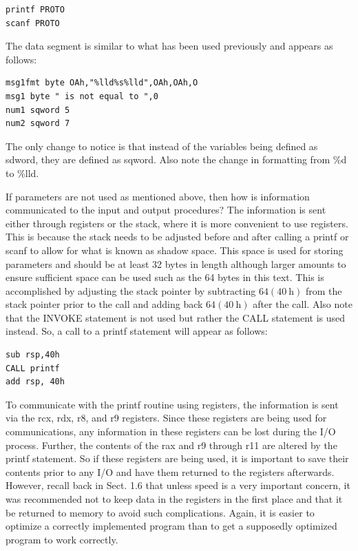 \documentclass[10pt]{book}
\begin{document}
\begin{verbatim}
printf PROTO
scanf PROTO
\end{verbatim}

The data segment is similar to what has been used previously and appears as follows:

\begin{verbatim}
msg1fmt byte OAh,"%lld%s%lld",OAh,OAh,O
msg1 byte " is not equal to ",0
num1 sqword 5
num2 sqword 7
\end{verbatim}

The only change to notice is that instead of the variables being defined as sdword, they are defined as sqword. Also note the change in formatting from \%d to \%lld.

If parameters are not used as mentioned above, then how is information communicated to the input and output procedures? The information is sent either through registers or the stack, where it is more convenient to use registers. This is because the stack needs to be adjusted before and after calling a printf or scanf to allow for what is known as shadow space. This space is used for storing parameters and should be at least 32 bytes in length although larger amounts to ensure sufficient space can be used such as the 64 bytes in this text. This is accomplished by adjusting the stack pointer by subtracting $64(40 \mathrm{~h})$ from the stack pointer prior to the call and adding back $64(40 \mathrm{~h})$ after the call. Also note that the INVOKE statement is not used but rather the CALL statement is used instead. So, a call to a printf statement will appear as follows:

\begin{verbatim}
sub rsp,40h
CALL printf
add rsp, 40h
\end{verbatim}

To communicate with the printf routine using registers, the information is sent via the rcx, rdx, r8, and r9 registers. Since these registers are being used for communications, any information in these registers can be lost during the I/O process. Further, the contents of the rax and r9 through r11 are altered by the printf statement. So if these registers are being used, it is important to save their contents prior to any I/O and have them returned to the registers afterwards. However, recall back in Sect. 1.6 that unless speed is a very important concern, it was recommended not to keep data in the registers in the first place and that it be returned to memory to avoid such complications. Again, it is easier to optimize a correctly implemented program than to get a supposedly optimized program to work correctly.
\end{document}
